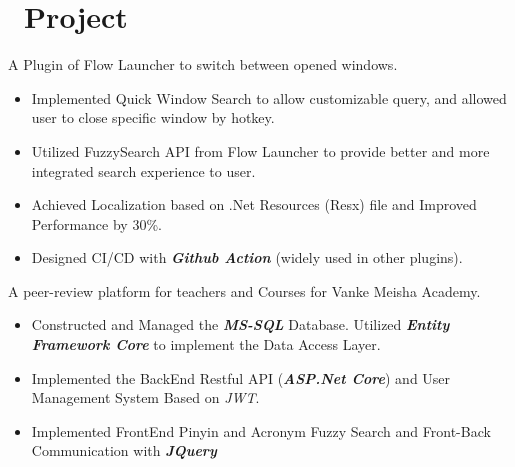 \documentclass{resume}
\begin{document}
\section{\texorpdfstring{\faList}{}\ Project}

A Plugin of Flow Launcher to switch between opened windows.
\begin{itemize}
  \item Implemented Quick Window Search to allow customizable query, and allowed user to close specific window by hotkey.
  \item Utilized FuzzySearch API from Flow Launcher to provide better and more integrated search experience to user.
  \item Achieved Localization based on .Net Resources (Resx) file and Improved Performance by 30\%.
  \item Designed CI/CD with \textbf{\textit{Github Action}} (widely used in other plugins).
\end{itemize}


A peer-review platform for teachers and Courses for Vanke Meisha Academy.
\begin{itemize}
  \item Constructed and Managed the \textbf{\textit{MS-SQL}} Database. Utilized \textbf{\textit{Entity Framework Core}} to implement the Data Access Layer.
  \item Implemented the BackEnd Restful API (\textbf{\textit{ASP.Net Core}}) and User Management System Based on \textit{JWT}.
  \item Implemented FrontEnd Pinyin and Acronym Fuzzy Search and Front-Back Communication with \textbf{\textit{JQuery}}
\end{itemize}


\end{document}
